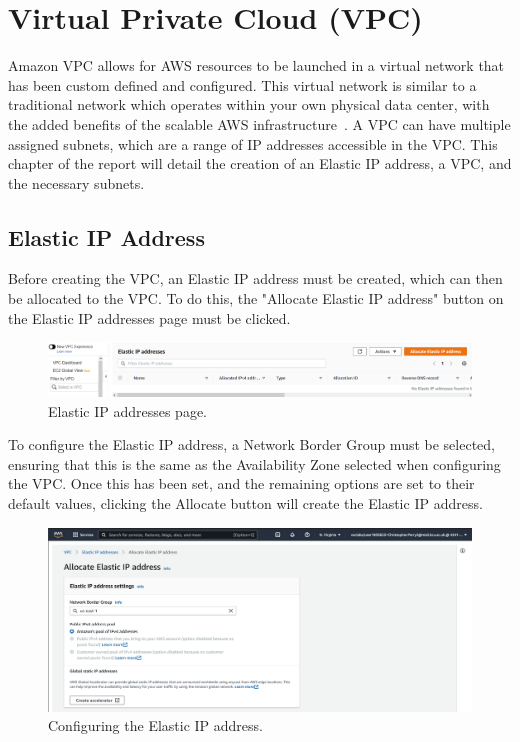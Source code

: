 \chapter{Virtual Private Cloud (VPC)}\label{ch:vpc}

Amazon VPC allows for AWS resources to be launched in a virtual network that has been custom defined and configured.
This virtual network is similar to a traditional network which operates within your own physical data center, with the
added benefits of the scalable AWS infrastructure~\parencite{amazon2022what}.
A VPC can have multiple assigned subnets, which are a range of IP addresses accessible in the VPC\@.
This chapter of the report will detail the creation of an Elastic IP address, a VPC, and the necessary subnets.

\section{Elastic IP Address}\label{sec:elastic-ip-address}

Before creating the VPC, an Elastic IP address must be created, which can then be allocated to the VPC\@.
To do this, the "Allocate Elastic IP address" button on the Elastic IP addresses page must be clicked.

\begin{figure}[!htbp]
    \centering
    \includegraphics[width=\textwidth]{resources/vpc/blank_elastic}
    \caption{Elastic IP addresses page.}
    \label{fig:blank-elastic}
\end{figure}

To configure the Elastic IP address, a Network Border Group must be selected, ensuring that this is the same as the
Availability Zone selected when configuring the VPC\@.
Once this has been set, and the remaining options are set to their default values, clicking the Allocate button will
create the Elastic IP address.

\begin{figure}[!htbp]
    \centering
    \includegraphics[width=\textwidth]{resources/vpc/vpc_elastic_ip_addresses}
    \caption{Configuring the Elastic IP address.}
    \label{fig:config-elastic}
\end{figure}

